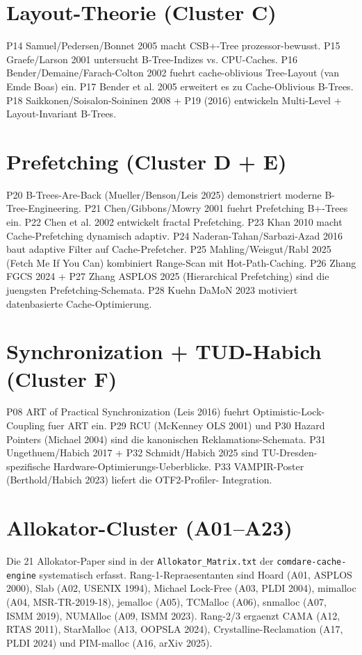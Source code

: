 \section{Layout-Theorie (Cluster C)}

P14 Samuel/Pedersen/Bonnet 2005 macht CSB+-Tree prozessor-bewusst.
P15 Graefe/Larson 2001 untersucht B-Tree-Indizes vs. CPU-Caches.
P16 Bender/Demaine/Farach-Colton 2002 fuehrt cache-oblivious
Tree-Layout (van Emde Boas) ein.
P17 Bender et al. 2005 erweitert es zu Cache-Oblivious B-Trees.
P18 Saikkonen/Soisalon-Soininen 2008 + P19 (2016) entwickeln
Multi-Level + Layout-Invariant B-Trees.

\section{Prefetching (Cluster D + E)}

P20 B-Trees-Are-Back (Mueller/Benson/Leis 2025) demonstriert moderne
B-Tree-Engineering.
P21 Chen/Gibbons/Mowry 2001 fuehrt Prefetching B+-Trees ein.
P22 Chen et al. 2002 entwickelt fractal Prefetching.
P23 Khan 2010 macht Cache-Prefetching dynamisch adaptiv.
P24 Naderan-Tahan/Sarbazi-Azad 2016 baut adaptive Filter auf
Cache-Prefetcher.
P25 Mahling/Weisgut/Rabl 2025 (Fetch Me If You Can) kombiniert
Range-Scan mit Hot-Path-Caching.
P26 Zhang FGCS 2024 + P27 Zhang ASPLOS 2025 (Hierarchical Prefetching)
sind die juengsten Prefetching-Schemata.
P28 Kuehn DaMoN 2023 motiviert datenbasierte Cache-Optimierung.

\section{Synchronization + TUD-Habich (Cluster F)}

P08 ART of Practical Synchronization (Leis 2016) fuehrt
Optimistic-Lock-Coupling fuer ART ein.
P29 RCU (McKenney OLS 2001) und P30 Hazard Pointers (Michael 2004) sind
die kanonischen Reklamations-Schemata.
P31 Ungethuem/Habich 2017 + P32 Schmidt/Habich 2025 sind
TU-Dresden-spezifische Hardware-Optimierungs-Ueberblicke.
P33 VAMPIR-Poster (Berthold/Habich 2023) liefert die OTF2-Profiler-
Integration.

\section{Allokator-Cluster (A01--A23)}

Die 21 Allokator-Paper sind in der \texttt{Allokator\_Matrix.txt} der
\texttt{comdare-cache-engine} systematisch erfasst. Rang-1-Repraesentanten
sind Hoard (A01, ASPLOS 2000), Slab (A02, USENIX 1994),
Michael Lock-Free (A03, PLDI 2004), mimalloc (A04, MSR-TR-2019-18),
jemalloc (A05), TCMalloc (A06), snmalloc (A07, ISMM 2019),
NUMAlloc (A09, ISMM 2023). Rang-2/3 ergaenzt CAMA (A12, RTAS 2011),
StarMalloc (A13, OOPSLA 2024), Crystalline-Reclamation (A17, PLDI 2024)
und PIM-malloc (A16, arXiv 2025).

